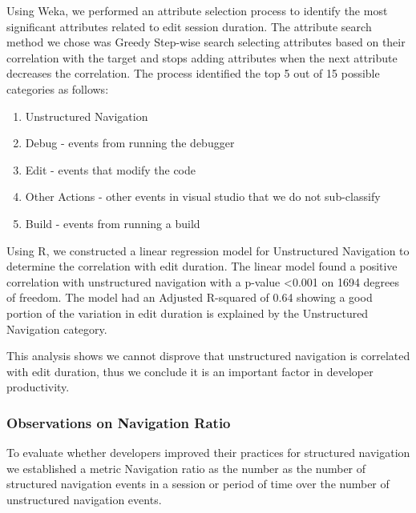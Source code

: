 \documentclass{sig-alternate}
\begin{document}
Using Weka\cite{Hall2009WEKA}, we performed an attribute selection process to identify the most significant attributes related to edit session duration.  The attribute search method we chose was Greedy Step-wise search selecting attributes based on their correlation with the target and stops adding attributes when the next attribute decreases the correlation.    The process identified the top 5 out of 15 possible categories as follows:
\begin{enumerate}[itemsep=0mm]
\item Unstructured Navigation
\item Debug - events from running the debugger
\item Edit - events that modify the code
\item Other Actions - other events in visual studio that we do not sub-classify
\item Build - events from running a build
\end{enumerate}

Using R\cite{Rcitation}, we constructed a linear regression model for Unstructured Navigation to determine the correlation with edit duration.  The linear model found a positive correlation with unstructured navigation with a p-value <0.001 on 1694 degrees of freedom.  The model had an Adjusted R-squared of 0.64 showing a good portion of the variation in edit duration is explained by the Unstructured Navigation category. 

This analysis shows we cannot disprove that unstructured navigation is correlated with edit duration, thus we conclude it is an important factor in developer productivity.  

\subsubsection{Observations on Navigation Ratio}

To evaluate whether developers improved their practices for structured navigation we established a metric Navigation ratio as the number as the number of structured navigation events in a session or period of time over the number of unstructured navigation events.  
\end{document}
